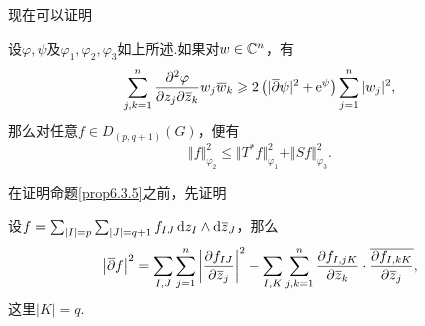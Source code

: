 现在可以证明
\begin{prop}\label{prop6.3.5}
	设$\varphi,\psi$及$\varphi_1,\varphi_2,\varphi_3$如上所述.如果对$w\in\MC^n$，有
	\begin{equation}\label{eq6.3.12}
		\sum_{j,k=1}^{n}\pppp{\varphi}{z_j}{\bar{z}_k}w_j\bar{w}_k\ge2\left(|\bar{\partial}\psi|^2+\ee^{\psi}\right)\sum_{j=1}^{n}|w_j|^2,
	\end{equation}
那么对任意$f\in D_{(p,q+1)}(G)$，便有
\[\Vert f\Vert_{\varphi_2}^2\le\Vert T^\ast f\Vert_{\varphi_1}^2+\Vert Sf\Vert_{\varphi_3}^2.\]
\end{prop}
在证明命题\ref{prop6.3.5}之前，先证明
\begin{lemma}\label{lem6.3.6}
	设$f=\sum_{|I|=p}\sum_{|J|=q+1}f_{IJ}\dz_I\wedge\dzz_J$，那么
	\[\left|\bar{\partial}f\right|^2=\sum_{I,J}\sum_{j=1}^{n}\left|\pp{f_{IJ}}{\bar{z}_j}\right|^2-\sum_{I,K}\sum_{j,k=1}^n \pp{f_{I,jK}}{\bar{z}_k}\cdot\bar{\pp{f_{I,kK}}{\bar{z}_j}},\]
	这里$|K|=q$.
\end{lemma}
